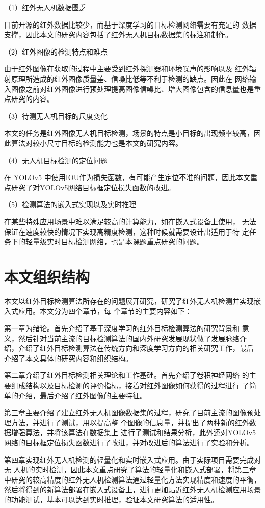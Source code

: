 （1）红外无人机数据匮乏

目前开源的红外数据比较少，而基于深度学习的目标检测网络需要有充足的
数据支撑，因此本文的研究内容包括了红外无人机目标数据集的标注和制作。

（2）红外图像的检测特点和难点

由于红外图像在获取的过程中主要受到红外探测器和环境噪声的影响以及
红外辐射原理所造成的红外图像质量差、信噪比低等不利于检测的缺点。因此在
网络输入图像之前对红外图像进行预处理提高图像信噪比、增大图像包含的信息量也是重点研究的内容。

（3）待测无人机目标的尺度变化

本文的任务是红外图像无人机目标检测，场景的特点是小目标的出现频率较高，因此算法对较小尺寸目标的检测能力也是本文的研究内容。

（4）无人机目标检测的定位问题

在 YOLOv5 中使用IOU作为损失函数，有可能产生定位不准的问题，因此本文重点研究了对YOLOv5网络目标框定位损失函数的改进。

（5）检测算法的嵌入式实现以及实时推理

在某些特殊应用场景中难以满足较高的计算能力，如在嵌入式设备上使用，
无法保证在速度较快的情况下实现高精度检测，这种时候就需要设计出适用于特
定任务下的轻量级实时目标检测网络，也是本课题重点研究的问题。

\section{本文组织结构}
本文以红外目标检测算法所存在的问题展开研究，研究了红外无人机检测并实现嵌入式应用。本文分为四个章节，每
个章节的主要内容如下：

第一章为绪论。首先介绍了基于深度学习的红外目标检测算法的研究背景和
意义，然后针对当前主流的目标检测算法的国内外研究发展现状做了发展脉络介
绍，介绍了红外目标检测算法在传统方向和深度学习方向的相关研究工作，最后
介绍了本文具体的研究内容和组织结构。

第二章介绍了红外目标检测相关理论和工作基础。首先介绍了卷积神经网络
的主要组成结构以及目标检测的评价指标，接着对红外图像如何获得的过程进行
了简单的介绍，最后介绍了红外图像的主要特征。

第三章主要介绍了建立红外无人机图像数据集的过程，研究了目前主流的图像预处理方法，并进行了测试，用以提高整
个图像的信息量，并提出了两种新的红外数据增强算法，并将该算法在数据集上
进行了测试和结果分析，此外还对YOLOv5网络的目标框定位损失函数进行了改进，并对改进后的算法进行了实验和分析。

第四章实现红外无人机检测的轻量化和实时嵌入式应用。由于实际项目需要完成对无
人机的实时检测，因此本文重点研究了算法的轻量化和嵌入式部署，将第三章中研究的较高精度的红外无人机检测算法通过轻量化方法实现精度和速度的平衡，然后将得到的新算法部署在嵌入式设备上，进行更加贴近红外无人机检测应用场景的功能测试，基本可以达到实时推理，验证本文研究算法的适用性。

